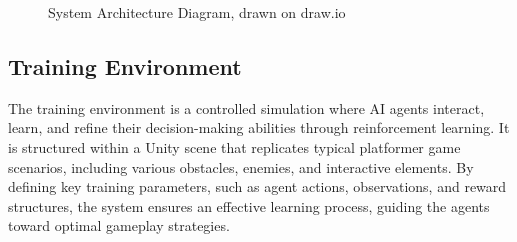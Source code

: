 \documentclass[12pt,oneside,openright,a4paper]{cpe-english-project}
\begin{document}
\begin{figure}[H]
\centering
{}
\caption{System Architecture Diagram, drawn on draw.io}\label{fig:SystemDiagram}
\end{figure}
\FloatBarrier
\subsection{Training Environment}
The training environment is a controlled simulation where AI agents interact, learn, and refine their decision-making abilities through reinforcement learning. It is structured within a Unity scene that replicates typical platformer game scenarios, including various obstacles, enemies, and interactive elements. By defining key training parameters, such as agent actions, observations, and reward structures, the system ensures an effective learning process, guiding the agents toward optimal gameplay strategies.
\end{document}
